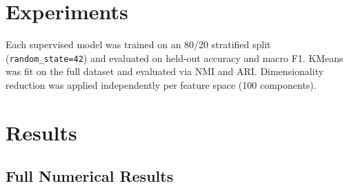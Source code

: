 \documentclass[11pt,a4paper]{article}
\begin{document}
\section{Experiments}

Each supervised model was trained on an 80/20 stratified split
(\texttt{random\_state=42}) and evaluated on held-out accuracy and macro F1.
KMeans was fit on the full dataset and evaluated via NMI and ARI.
Dimensionality reduction was applied independently per feature space (100 components).

\section{Results}

\subsection{Full Numerical Results}
\end{document}
